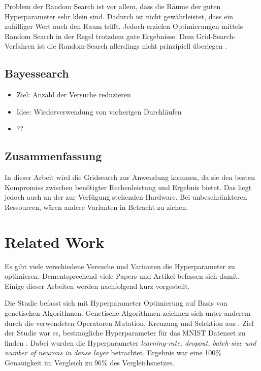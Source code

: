 Problem der Random Search ist vor allem, dass die Räume der guten Hyperparameter sehr klein sind.
Dadurch ist nicht gewährleistet, dass ein zufälliger Wert auch den Raum trifft.
Jedoch erzielen Optimierungen mittels Random Search in der Regel trotzdem gute Ergebnisse.
Dem Grid-Search-Verfahren ist die Random-Search allerdings nicht prinzipiell überlegen \cite{hyperparameters-random-search}.

\subsection{Bayessearch}
\begin{itemize}
	\item Ziel: Anzahl der Versuche reduzieren
	\item Idee: Wiederverwendung von vorherigen Durchläufen
	\item ??
\end{itemize}

\subsection{Zusammenfassung}
In dieser Arbeit wird die Gridsearch zur Anwendung kommen, da sie den besten Kompromiss zwischen benötigter Rechenleistung und Ergebnis bietet.
Das liegt jedoch auch an der zur Verfügung stehenden Hardware.
Bei unbeschränkteren Ressourcen, wären andere Varianten in Betracht zu ziehen.



\section{Related Work}
Es gibt viele verschiedene Versuche und Varianten die Hyperparameter zu optimieren.
Dementsprechend viele Papers und Artikel befassen sich damit.
Einige dieser Arbeiten werden nachfolgend kurz vorgestellt.
\newline

Die Studie befasst sich mit Hyperparameter Optimierung auf Basis von genetischen Algorithmen.
Genetische Algorithmen zeichnen sich unter anderem durch die verwendeten Operatoren Mutation, Kreuzung und Selektion aus \cite{genetic-algorithms}.
Ziel der Studie war es, bestmögliche Hyperparameter für das MNIST Datenset zu finden \cite{dataset:mnist}.
Dabei wurden die Hyperparameter \textit{learning-rate, dropout, batch-size und number of neurons in dense layer} betrachtet.
Ergebnis war eine 100\% Genauigkeit im Vergleich zu 96\% des Vergleichsnetzes.
\newline


